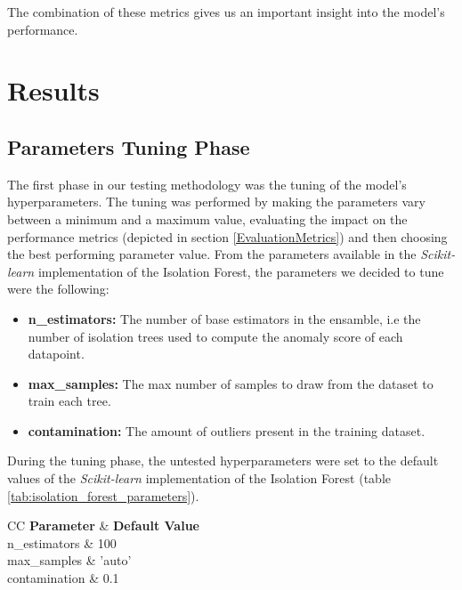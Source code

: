 \documentclass[futureinternet,article,submit,pdftex,moreauthors]{Definitions/mdpi}
\begin{document}
The combination of these metrics gives us an important insight into the model's performance. 

\section{Results}

\subsection{Parameters Tuning Phase}

The first phase in our testing methodology was the tuning of the model's hyperparameters. The tuning was performed by making the parameters vary between a minimum and a maximum value, evaluating the impact on the performance metrics (depicted in section \ref{EvaluationMetrics}) and then choosing the best performing parameter value.
From the parameters available in the \textit{Scikit-learn} implementation of the Isolation Forest, the parameters we decided to tune were the following: 

\begin{itemize}
	\item \textbf{n\_estimators:} The number of base estimators in the ensamble, i.e the number of isolation trees used to compute the anomaly score of each datapoint. 
	\item \textbf{max\_samples:} The max number of samples to draw from the dataset to train each tree.
	\item \textbf{contamination:} The amount of outliers present in the training dataset.  
\end{itemize}

During the tuning phase, the untested hyperparameters were set to the default values of the \textit{Scikit-learn} implementation of the Isolation Forest (table \ref{tab:isolation_forest_parameters}).

\begin{table}[H]
	\caption{Scikit-Learn Isolation Forest hyperparameters default values.\label{tab:isolation_forest_parameters}}
	\begin{tabularx}{\textwidth}{CC}
	\toprule
	\textbf{Parameter} & \textbf{Default Value} \\
	\midrule
	n\_estimators & 100 \\
	max\_samples & 'auto' \\
	contamination & 0.1 \\
	\bottomrule
	\end{tabularx}
\end{table}
\end{document}
